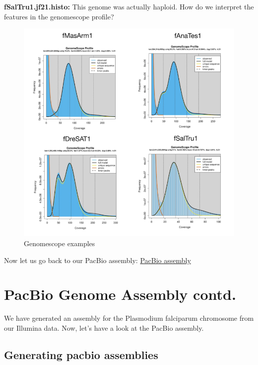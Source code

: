 \documentclass[11pt]{article}
\begin{document}
\textbf{fSalTru1.jf21.histo:} This genome was actually haploid. How do
we interpret the features in the genomescope profile?

    \begin{figure}
\centering
\includegraphics{images/gscope_examples.png}
\caption{Genomescope examples}
\end{figure}

    Now let us go back to our PacBio assembly:
\href{pacbio_assembly_again.ipynb}{PacBio assembly}





\newpage





    \hypertarget{pacbio-genome-assembly-contd.}{%
\section{PacBio Genome Assembly
contd.}\label{pacbio-genome-assembly-contd.}}

We have generated an assembly for the Plasmodium falciparum chromosome
from our Illumina data. Now, let's have a look at the PacBio assembly.

\hypertarget{generating-pacbio-assemblies}{%
\subsection{Generating pacbio
assemblies}\label{generating-pacbio-assemblies}}
\end{document}
